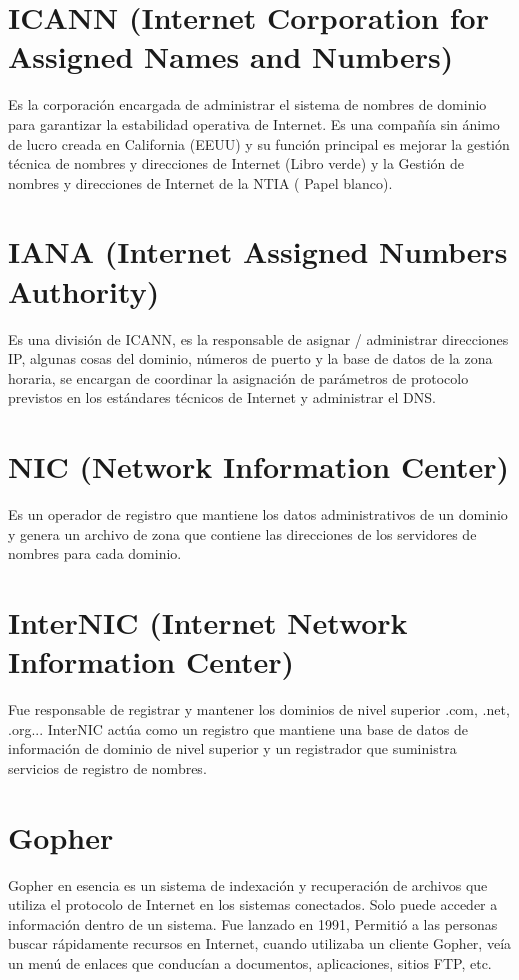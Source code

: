 \documentclass[letterpaper, 10 pt, conference]{ieeeconf}  %
\begin{document}
\section{ICANN (Internet Corporation for Assigned Names and Numbers)}

Es la corporación encargada de administrar el sistema de nombres de dominio para garantizar la estabilidad operativa de Internet. Es una compañía sin ánimo de lucro creada en California (EEUU)  y su función principal es mejorar la gestión técnica de nombres y direcciones de Internet (Libro verde) y la Gestión de nombres y direcciones de Internet de la NTIA ( Papel blanco).

\section{IANA (Internet Assigned Numbers Authority)}

Es una división de ICANN, es la responsable de asignar / administrar direcciones IP, algunas cosas del dominio, números de puerto y la base de datos de la zona horaria, se encargan de coordinar la asignación de parámetros de protocolo previstos en los estándares técnicos de Internet y administrar el DNS.

\section{NIC (Network Information Center)}

Es un operador de registro que mantiene los datos administrativos de un dominio y genera un archivo de zona que contiene las direcciones de los servidores de nombres para cada dominio.

\section{InterNIC (Internet Network Information Center)}

Fue responsable de registrar y mantener los dominios de nivel superior .com, .net, .org... InterNIC actúa como un registro que mantiene una base de datos de información de dominio de nivel superior y un registrador que suministra servicios de registro de nombres.

\section{Gopher}

Gopher en esencia es un sistema de indexación y recuperación de archivos que utiliza el protocolo de Internet en los sistemas conectados. Solo puede acceder a información dentro de un sistema. Fue lanzado en 1991, Permitió a las personas buscar rápidamente recursos en Internet, cuando utilizaba un cliente Gopher, veía un menú de enlaces que conducían a documentos, aplicaciones, sitios FTP, etc.
\end{document}
